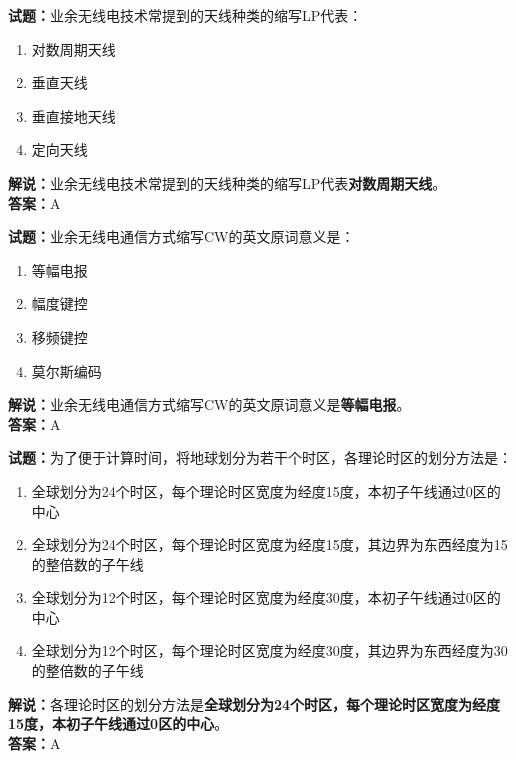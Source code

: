 \documentclass{ctexbook}
\begin{document}
\vspace{1em}

\textbf{试题：}业余无线电技术常提到的天线种类的缩写LP代表：
\begin{enumerate}[leftmargin=3em]
  \item 对数周期天线
  \item 垂直天线
  \item 垂直接地天线
  \item 定向天线
\end{enumerate}
\noindent\textbf{解说：}业余无线电技术常提到的天线种类的缩写LP代表\textbf{对数周期天线}。\\\noindent\textbf{答案：}A

\vspace{1em}

\textbf{试题：}业余无线电通信方式缩写CW的英文原词意义是：
\begin{enumerate}[leftmargin=3em]
  \item 等幅电报
  \item 幅度键控
  \item 移频键控
  \item 莫尔斯编码
\end{enumerate}
\noindent\textbf{解说：}业余无线电通信方式缩写CW的英文原词意义是\textbf{等幅电报}。\\\noindent\textbf{答案：}A

\vspace{1em}

\textbf{试题：}为了便于计算时间，将地球划分为若干个时区，各理论时区的划分方法是：
\begin{enumerate}[leftmargin=3em]
  \item 全球划分为24个时区，每个理论时区宽度为经度15度，本初子午线通过0区的中心
  \item 全球划分为24个时区，每个理论时区宽度为经度15度，其边界为东西经度为15的整倍数的子午线
  \item 全球划分为12个时区，每个理论时区宽度为经度30度，本初子午线通过0区的中心
  \item 全球划分为12个时区，每个理论时区宽度为经度30度，其边界为东西经度为30的整倍数的子午线
\end{enumerate}
\noindent\textbf{解说：}各理论时区的划分方法是\textbf{全球划分为24个时区，每个理论时区宽度为经度15度，本初子午线通过0区的中心}。\\\noindent\textbf{答案：}A

\vspace{1em}
\end{document}
